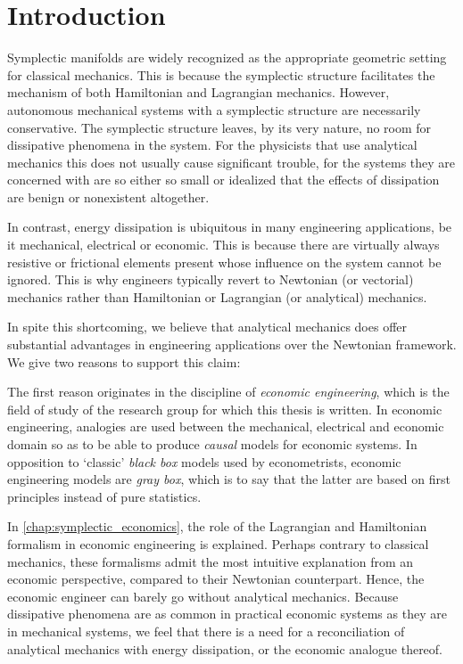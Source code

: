 \chapter{Introduction}
\label{chap:intro}

Symplectic manifolds are widely recognized as the appropriate geometric setting for classical mechanics. This is because the symplectic structure facilitates the mechanism of both Hamiltonian and Lagrangian mechanics. However, autonomous mechanical systems with a symplectic structure are necessarily conservative. The symplectic structure leaves, by its very nature, no room for dissipative phenomena in the system. For the physicists that use analytical mechanics this does not usually cause significant trouble, for the systems they are concerned with are so either so small or idealized that the effects of dissipation are benign or nonexistent altogether.

In contrast, energy dissipation is ubiquitous in many engineering applications, be it mechanical, electrical or economic. This is because there are virtually always resistive or frictional elements present whose influence on the system cannot be ignored. This is why engineers typically revert to Newtonian (or vectorial) mechanics rather than Hamiltonian or Lagrangian (or analytical) mechanics.

In spite this shortcoming, we believe that analytical mechanics does offer substantial advantages in engineering applications over the Newtonian framework. We give two reasons to support this claim:

The first reason originates in the discipline of \emph{economic engineering}, which is the field of study of the research group for which this thesis is written. In economic engineering, analogies are used between the mechanical, electrical and economic domain so as to be able to produce \emph{causal} models for economic systems. In opposition to `classic' \emph{black box} models used by econometrists, economic engineering models are \emph{gray box}, which is to say that the latter are based on first principles instead of pure statistics. 

In \cref{chap:symplectic_economics}, the role of the Lagrangian and Hamiltonian formalism in economic engineering is explained. Perhaps contrary to classical mechanics, these formalisms admit the most intuitive explanation from an economic perspective, compared to their Newtonian counterpart. Hence, the economic engineer can barely go without analytical mechanics. Because dissipative phenomena are as common in practical economic systems as they are in mechanical systems, we feel that there is a need for a reconciliation of analytical mechanics with energy dissipation, or the economic analogue thereof.

